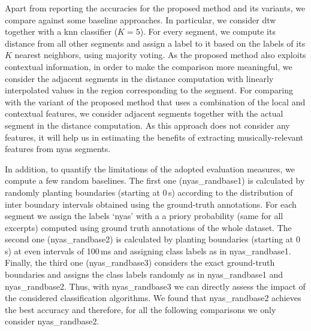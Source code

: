 {Apart from reporting the accuracies for the proposed method and its variants, we compare against some baseline approaches. In particular, we consider \gls{dtw} together with a \gls{knn} classifier ($K=5$). For every segment, we compute its distance from all other segments and assign a label to it based on the labels of its $K$ nearest neighbors, using majority voting. As the proposed method also exploits contextual information, in order to make the comparison more meaningful, we consider the adjacent segments in the distance computation with linearly interpolated values in the region corresponding to the segment. For comparing with the variant of the proposed method that uses a combination of the local and contextual features, we consider adjacent segments together with the actual segment in the distance computation. As this approach does not consider any features, it will help us in estimating the benefits of extracting musically-relevant features from \gls{nyas} segments. 

In addition, to quantify the limitations of the adopted evaluation measures, we compute a few random baselines. The first one (\acrshort{nyas_randbase1}) is calculated by randomly planting boundaries (starting at 0\,s) according to the distribution of inter boundary intervals obtained using the ground-truth annotations. For each segment we assign the labels `\gls{nyas}' with a a priory probability (same for all excerpts) computed using ground truth annotations of the whole dataset. The second one (\acrshort{nyas_randbase2}) is calculated by planting boundaries (starting at 0\,s) at even intervals of 100\,ms and assigning class labels as in \acrshort{nyas_randbase1}. Finally, the third one (\acrshort{nyas_randbase3}) considers the exact ground-truth boundaries and assigns the class labels randomly as in \acrshort{nyas_randbase1} and \acrshort{nyas_randbase2}. Thus, with \acrshort{nyas_randbase3} we can directly assess the impact of the considered classification algorithms. We found that \acrshort{nyas_randbase2} achieves the best accuracy and therefore, for all the following comparisons we only consider \acrshort{nyas_randbase2}.

%

}
